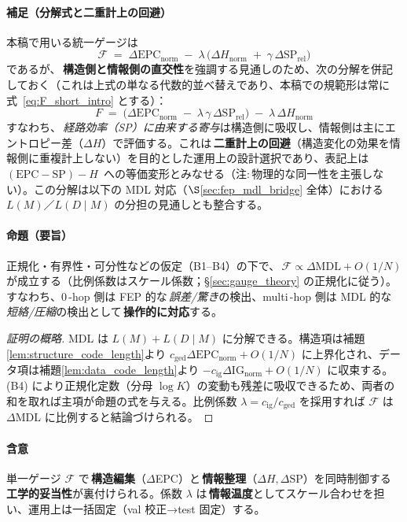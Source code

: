 \documentclass[ja=standard,xelatex]{bxjsarticle}
\newcommand{\F}{\mathcal{F}}
\newcommand{\gednorm}{\Delta\mathrm{EPC}_{\mathrm{norm}}}
\newcommand{\ignorm}{\Delta\mathrm{IG}_{\mathrm{norm}}}
\begin{document}

\paragraph{補足（分解式と二重計上の回避）}
本稿で用いる統一ゲージは
\[
  \F\;=\;\gednorm\; -\; \lambda\,\big(\Delta H_{\mathrm{norm}}\; +\; \gamma\,\Delta\mathrm{SP}_{\mathrm{rel}}\big)
\]
であるが、\,\textbf{構造側と情報側の直交性}を強調する見通しのため、次の分解を併記しておく（これは上式の単なる代数的並べ替えであり、本稿での規範形は常に式~\eqref{eq:F_short_intro} とする）：
\[
  \boxed{\;F\;=\;\big(\gednorm\; -\; \lambda\,\gamma\,\Delta\mathrm{SP}_{\mathrm{rel}}\big)\; -\; \lambda\,\Delta H_{\mathrm{norm}}\;}
\]
すなわち、\,\emph{経路効率（SP）に由来する寄与}は構造側に吸収し、情報側は主にエントロピー差（$\Delta H$）で評価する。これは\,\textbf{二重計上の回避}（構造変化の効果を情報側に重複計上しない）を目的とした運用上の設計選択であり、表記上は \,$(\mathrm{EPC}{-}\mathrm{SP}){-}H$\, への等価変形とみなせる（注:\,物理的な同一性を主張しない）。この分解は以下の MDL 対応（$\S$\ref{sec:fep_mdl_bridge} 全体）における $L(M)$／$L(D\mid M)$ の分担の見通しとも整合する。
\paragraph{命題（要旨）}\; 正規化・有界性・可分性などの仮定（B1–B4）の下で、\,\textbf{$\F\propto\Delta\mathrm{MDL}{+}O(1/N)$} が成立する（比例係数はスケール係数；§\ref{sec:gauge_theory} の正規化に従う）。すなわち、0\,\mbox{-}hop 側は FEP 的な\,\emph{誤差/驚き}の検出、multi\,\mbox{-}hop 側は MDL 的な\,\emph{短絡/圧縮}の検出として\,\textbf{操作的に対応}する。
\begin{proof}[証明の概略]
MDL は $L(M)+L(D\mid M)$ に分解できる。構造項は補題\ref{lem:structure_code_length}より $c_{\mathrm{ged}}\gednorm+O(1/N)$ に上界化され、データ項は補題\ref{lem:data_code_length}より $-c_{\mathrm{ig}}\ignorm+O(1/N)$ に収束する。(B4) により正規化定数（分母 $\log K$）の変動も残差に吸収できるため、両者の和を取れば主項が命題の式を与える。比例係数 $\lambda=c_{\mathrm{ig}}/c_{\mathrm{ged}}$ を採用すれば $\F$ は $\Delta\mathrm{MDL}$ に比例すると結論づけられる。
\end{proof}
\paragraph{含意}\; 単一ゲージ $\F$ で\,\textbf{構造編集}（$\Delta$EPC）と\,\textbf{情報整理}（$\Delta H,\Delta\mathrm{SP}$）を同時制御する\,\textbf{工学的妥当性}が裏付けられる。係数 $\lambda$ は\,\textbf{情報温度}としてスケール合わせを担い、運用上は一括固定（val 校正→test 固定）する。
\end{document}
